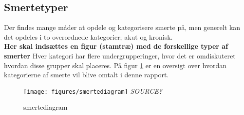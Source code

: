 
\subsection{Smertetyper}


Der findes mange måder at opdele og kategorisere smerte på, men generelt kan det opdeles i to overordnede kategorier; akut og kronisk. \\
\textbf{Her skal indsættes en figur (stamtræ) med de forskellige typer af smerter} 
Hver kategori har flere undergrupperinger, hvor det er omdiskuteret hvordan disse grupper skal placeres. \citep{Giangragorio1997} På figur \ref{smertediagram} er en oversigt over hvordan kategorierne af smerte vil blive omtalt i denne rapport.

\begin{figure}[H]
	\caption{smertediagram}
	\label{smertediagram}
	\centering
	\texttt{[image: figures/smertediagram]}
	\flushleft
	\textit{SOURCE?}
\end{figure}

